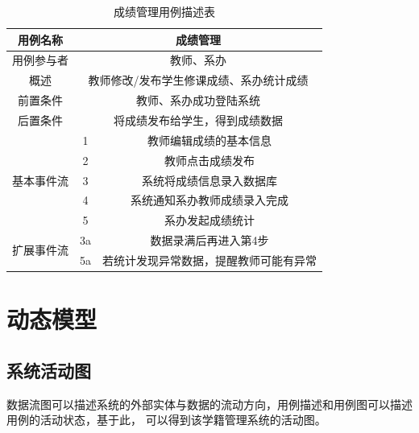 \documentclass[12pt, a4paper, oneside]{ctexart}
\begin{document}
\begin{table}[H]
    \centering
    \begin{tabular}{|c|cc|}
    \hline
    用例名称                   & \multicolumn{2}{c|}{成绩管理}                     \\ \hline
    用例参与者                  & \multicolumn{2}{c|}{教师、系办}                    \\ \hline
    概述                     & \multicolumn{2}{c|}{教师修改/发布学生修课成绩、系办统计成绩}     \\ \hline
    前置条件                   & \multicolumn{2}{c|}{教师、系办成功登陆系统}              \\ \hline
    后置条件                   & \multicolumn{2}{c|}{将成绩发布给学生，得到成绩数据}                 \\ \hline
    \multirow{5}{*}{基本事件流} & \multicolumn{1}{c|}{1}  & 教师编辑成绩的基本信息         \\ \cline{2-3} 
                           & \multicolumn{1}{c|}{2}  & 教师点击成绩发布            \\ \cline{2-3} 
                           & \multicolumn{1}{c|}{3}  & 系统将成绩信息录入数据库        \\ \cline{2-3} 
                           & \multicolumn{1}{c|}{4}  & 系统通知系办教师成绩录入完成      \\ \cline{2-3} 
                           & \multicolumn{1}{c|}{5}  & 系办发起成绩统计            \\ \hline
    \multirow{2}{*}{扩展事件流} & \multicolumn{1}{c|}{3a} & 数据录满后再进入第4步         \\ \cline{2-3} 
                           & \multicolumn{1}{c|}{5a} & 若统计发现异常数据，提醒教师可能有异常 \\ \hline
    \end{tabular}
    \caption{成绩管理用例描述表}
\end{table}

\section{动态模型}

\subsection{系统活动图}

数据流图可以描述系统的外部实体与数据的流动方向，用例描述和用例图可以描述用例的活动状态，基于此，
可以得到该学籍管理系统的活动图。
\end{document}
